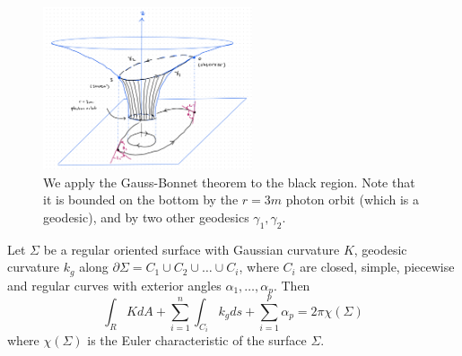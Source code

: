 %
\begin{figure}[!htb]
	\centering
	\includegraphics[width=0.55\textwidth]{img/gauss-bonnet-setup.png}
	\caption{We apply the Gauss-Bonnet theorem to the black region. Note that it is bounded on the bottom by the $r=3m$ photon orbit (which is a geodesic), and by two other geodesics $\gamma_1, \gamma_2$.}
	\label{}
\end{figure}

\begin{theorem}\label{thm:gauss-bonnet}
Let $\Sigma$ be a regular oriented surface with Gaussian curvature $K$, geodesic curvature $k_g$ along $\partial \Sigma = C_1 \cup C_2 \cup \ldots \cup C_i$, where $C_i$ are closed, simple, piecewise and regular curves with exterior angles $\alpha_1, \ldots, \alpha_p$. Then
\begin{equation}\label{eq:gauss-bonnet}
\int_R K dA + \sum_{i=1}^n \int_{C_i} k_g ds + \sum_{i=1}^p \alpha_p = 2 \pi \chi(\Sigma)
\end{equation}
where $\chi(\Sigma)$ is the Euler characteristic of the surface $\Sigma$.
\end{theorem}

